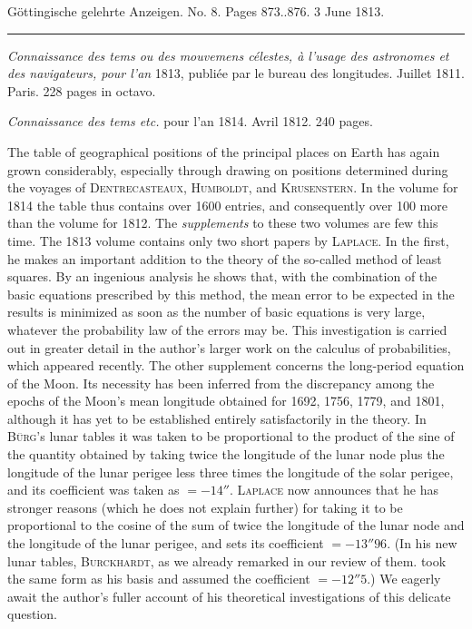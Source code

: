 \clearpage
{}
\hypertarget{native-559-lower}{}\label{native-559-lower}
\begin{center}\small Göttingische gelehrte Anzeigen. No. 8. Pages 873..876. 3 June 1813.\\[3pt]\rule{.72\linewidth}{.3pt}\end{center}

\emph{Connaissance des tems ou des mouvemens célestes, à l'usage des astronomes et des navigateurs, pour l'an} 1813, publiée par le bureau des longitudes. Juillet 1811. Paris. 228 pages in octavo.

\emph{Connaissance des tems etc.} pour l'an 1814. Avril 1812. 240 pages.

The table of geographical positions of the principal places on Earth has again grown considerably, especially through drawing on positions determined during the voyages of \textsc{Dentrecasteaux}, \textsc{Humboldt}, and \textsc{Krusenstern}. In the volume for 1814 the table thus contains over 1600 entries, and consequently over 100 more than the volume for 1812. The \emph{supplements} to these two volumes are few this time. The 1813 volume contains only two short papers by \textsc{Laplace}. In the first, he makes an important addition to the theory of the so-called method of least squares. By an ingenious analysis he shows that, with the combination of the basic equations prescribed by this method, the mean error to be expected in the results is minimized as soon as the number of basic equations is very large, whatever the probability law of the errors may be. This investigation is carried out in greater detail in the author's larger work on the calculus of probabilities, which appeared recently. The other supplement concerns the long-period equation of the Moon. Its necessity has been inferred from the discrepancy among the epochs of the Moon's mean longitude obtained for 1692, 1756, 1779, and 1801, although it has yet to be established entirely satisfactorily in the theory. In \textsc{Bürg}'s lunar tables it was taken to be proportional to the product of the sine of the quantity obtained by taking twice the longitude of the lunar node plus the longitude of the lunar perigee less three times the longitude of the solar perigee, and its coefficient was taken as $= -14''$. \textsc{Laplace} now announces that he has stronger reasons (which he does not explain further) for taking it to be proportional to the cosine of the sum of twice the longitude of the lunar node and the longitude of the lunar perigee, and sets its coefficient $= -13''96$. (In his new lunar tables, \textsc{Burckhardt}, as we already remarked in our review of them. took the same form as his basis and assumed the coefficient $= -12''5$.) We eagerly await the author's fuller account of his theoretical investigations of this delicate question.

